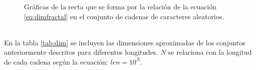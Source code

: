 \documentclass[letterpaper,12pt,oneside]{book}
\begin{document}
\begin{figure}[h!]
\centering
\begin{minipage}{0.3\linewidth}
\centering
{}
\end{minipage}%
\begin{minipage}{0.3\linewidth}
\centering
{}
\end{minipage}

\caption{Gráficas de la recta que se forma por la relación de la ecuación \ref{eq:dimfractal} en el conjunto de cadenas de caracteres aleatorios.}
\label{fig:dim_random}
\end{figure}
\\

En la tabla \ref{tab:dim} se incluyen las dimensiones aproximadas de los conjuntos anteriormente descritos para diferentes longitudes. $N$ se relaciona con la longitud de cada cadena según la ecuación: $len = 10^{N}$.
\\
\end{document}
